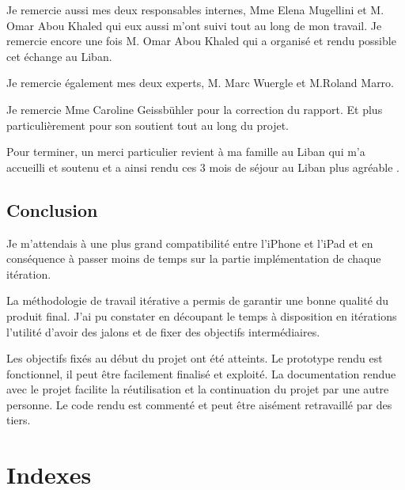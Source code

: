 \documentclass[12pt,a4paper,twoside]{report}
\begin{document}
Je remercie aussi mes deux responsables internes, Mme Elena Mugellini et M. Omar Abou Khaled qui eux aussi m'ont suivi tout au long de mon travail.
Je remercie encore une fois M. Omar Abou Khaled  qui a organisé et rendu possible cet échange au Liban. 

Je remercie également mes deux experts, M. Marc Wuergle et M.Roland Marro.

Je remercie Mme Caroline Geissbühler pour la correction du rapport. Et plus particulièrement pour son soutient tout au long du projet. 

Pour terminer, un merci particulier revient à ma famille au Liban qui m'a accueilli et soutenu et a ainsi rendu ces 3 mois de séjour au Liban plus agréable .

\section{Conclusion}
Je m'attendais à une plus grand compatibilité entre l'iPhone et l'iPad et en conséquence à passer moins de temps sur la partie implémentation de chaque itération.

La méthodologie de travail itérative a permis de garantir une bonne  qualité du produit final. J'ai pu constater en découpant le temps à disposition en itérations l'utilité d'avoir des jalons et de fixer des objectifs intermédiaires. 

Les objectifs fixés au début du projet ont été atteints. Le prototype rendu est fonctionnel, il peut être facilement finalisé et exploité.  La documentation rendue avec le projet facilite la réutilisation et la continuation du projet  par une autre personne. Le code rendu est commenté et peut être aisément retravaillé par des tiers.

\cleardoublepage


\chapter{Indexes}
\cleardoublepage

\renewcommand{\bibname}{Références}

\begin{flushleft}

\end{flushleft}




\printglossaries

\listoffigures

\lstlistoflistings
\end{document}
